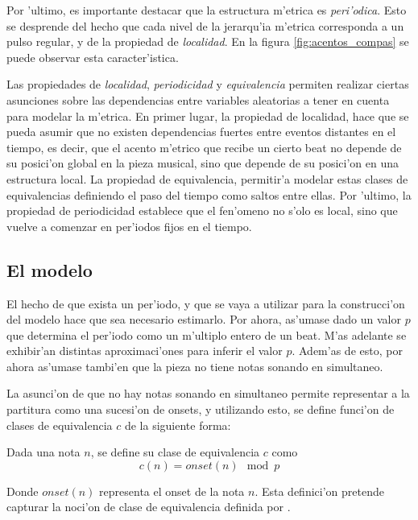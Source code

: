 Por 'ultimo, es importante destacar que la estructura m'etrica es \emph{peri'odica}. Esto se desprende del hecho que cada nivel 
de la jerarqu'ia m'etrica corresponda a un pulso regular, y de la propiedad de \emph{localidad}. En la figura 
\ref{fig:acentos_compas} se puede observar esta caracter'istica.  

Las propiedades de \emph{localidad}, \emph{periodicidad} y \emph{equivalencia} permiten realizar ciertas asunciones sobre las dependencias entre variables aleatorias 
a tener en cuenta para modelar la m'etrica. En primer lugar, la propiedad de localidad, hace que se pueda asumir que no existen dependencias fuertes 
entre eventos distantes en el tiempo, es decir, que el acento m'etrico que recibe un cierto beat no depende de su posici'on global en la pieza musical, 
sino que depende de su posici'on en una estructura local.   
La propiedad de equivalencia, permitir'a modelar estas clases de equivalencias definiendo el paso del tiempo como saltos entre ellas. 
Por 'ultimo, la propiedad de periodicidad establece que el fen'omeno no s'olo es local, 
sino que vuelve a comenzar en per'iodos fijos en el tiempo.

\subsection{El modelo}
\label{sec:rythm_model}
El hecho de que exista un per'iodo, y que se vaya a utilizar para la construcci'on del modelo hace que sea necesario estimarlo. Por ahora, as'umase dado un valor 
$p$ que determina el per'iodo como un m'ultiplo entero de un beat. M'as adelante se exhibir'an distintas aproximaci'ones para inferir el valor $p$. Adem'as
de esto, por ahora as'umase tambi'en que la pieza no tiene notas sonando en simultaneo.

La asunci'on de que no hay notas sonando en simultaneo permite representar a la partitura como una sucesi'on de onsets, y utilizando esto, se define 
funci'on de clases de equivalencia $c$ de la siguiente forma:

\begin{definition}
\label{def:traduccion_original}
Dada una nota $n$, se define su clase de equivalencia $c$ como $$c(n) = onset(n)\mod p$$
\end{definition}

Donde $onset(n)$ representa el onset de la nota $n$.  Esta definici'on pretende capturar la noci'on de clase de equivalencia definida por \citep{clarke1987categorical}.


